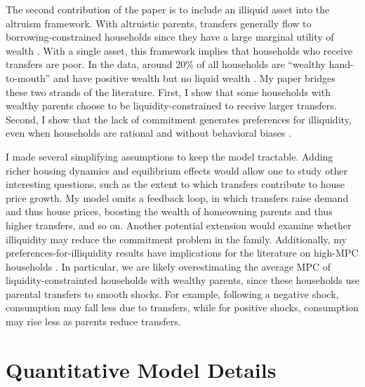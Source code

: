 \documentclass[12pt]{article}
\begin{document}
The second contribution of the paper is to include an illiquid asset into the altruism framework. With altruistic parents, transfers generally flow to borrowing-constrained households since they have a large marginal utility of wealth \citep{Barczyk2020,Chu2020}. With a single asset, this framework implies that households who receive transfers are poor. In the data, around 20\% of all households are ``wealthy hand-to-mouth'' and have positive wealth but no liquid wealth \citep{Kaplan2014a,Attanasio2018}. My paper bridges these two strands of the literature. First, I show that some households with wealthy parents choose to be liquidity-constrained to receive larger transfers. Second, I show that the lack of commitment generates preferences for illiquidity, even when households are rational and without behavioral biases \citep[see e.g.,][]{attanasio2024temptation}. 

I made several simplifying assumptions to keep the model tractable. Adding richer housing dynamics and equilibrium effects would allow one to study other interesting questions, such as the extent to which transfers contribute to house price growth. My model omits a feedback loop, in which transfers raise demand and thus house prices, boosting the wealth of homeowning parents and thus higher transfers, and so on. Another potential extension would examine whether illiquidity may reduce the commitment problem in the family. Additionally, my preferences-for-illiquidity results have implications for the literature on high-MPC households \citep[see e.g.,][]{kaplan2022marginal}. In particular, we are likely overestimating the average MPC of liquidity-constrainted households with wealthy parents, since these households use parental transfers to smooth shocks.  For example, following a negative shock, consumption may fall less due to transfers, while for positive shocks, consumption may rise less as parents reduce transfers.

\newpage
\begingroup\singlespacing


\endgroup
\newpage


\appendix

\setcounter{figure}{0}
\renewcommand{\thefigure}{A\arabic{figure}}
\setcounter{table}{0}
\renewcommand{\thetable}{A\arabic{table}}

\section{Quantitative Model Details} 
\end{document}
